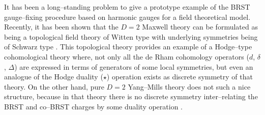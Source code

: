 \documentclass[a4paper,11pt]{article}
\begin{document}
It has been a long--standing problem to give a prototype example of the
BRST gauge--fixing procedure based on harmonic gauges for a field theoretical
model. Recently, it has been shown that the $D = 2$ Maxwell theory can 
be formulated as being a topological field theory of Witten type with 
underlying symmetries being 
of Schwarz type \cite{13}. This topological theory provides an example 
of a Hodge--type cohomological theory where, not only all the de Rham 
cohomology operators ($d$, $\delta$, $\Delta$) are expressed in terms of 
generators of some local symmetries, but even an analogue of the Hodge 
duality ($\star$) operation exists as discrete 
symmetry of that theory. On the other hand, pure 
$D = 2$ Yang--Mills theory does not such a nice structure, because in that 
theory there is no discrete symmetry inter--relating the BRST and co--BRST 
charges by some duality operation \cite{14}.    
\end{document}
